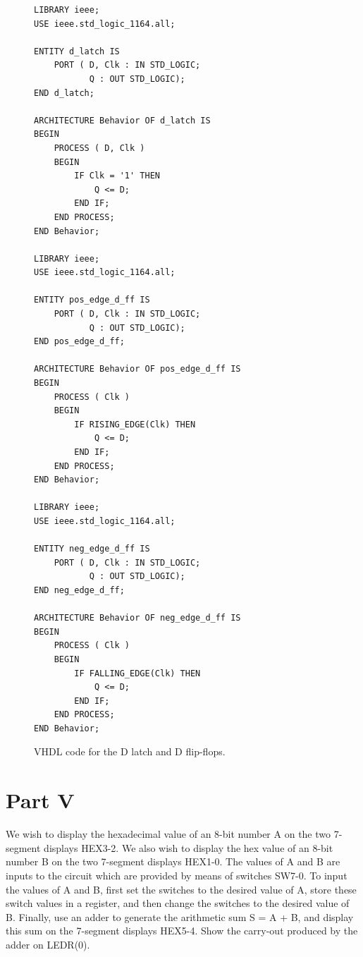 \documentclass{article}
\begin{document}
\begin{figure}[H]
    \centering
    \begin{verbatim}
LIBRARY ieee;
USE ieee.std_logic_1164.all;

ENTITY d_latch IS
    PORT ( D, Clk : IN STD_LOGIC;
           Q : OUT STD_LOGIC);
END d_latch;

ARCHITECTURE Behavior OF d_latch IS
BEGIN
    PROCESS ( D, Clk )
    BEGIN
        IF Clk = '1' THEN
            Q <= D;
        END IF;
    END PROCESS;
END Behavior;

LIBRARY ieee;
USE ieee.std_logic_1164.all;

ENTITY pos_edge_d_ff IS
    PORT ( D, Clk : IN STD_LOGIC;
           Q : OUT STD_LOGIC);
END pos_edge_d_ff;

ARCHITECTURE Behavior OF pos_edge_d_ff IS
BEGIN
    PROCESS ( Clk )
    BEGIN
        IF RISING_EDGE(Clk) THEN
            Q <= D;
        END IF;
    END PROCESS;
END Behavior;

LIBRARY ieee;
USE ieee.std_logic_1164.all;

ENTITY neg_edge_d_ff IS
    PORT ( D, Clk : IN STD_LOGIC;
           Q : OUT STD_LOGIC);
END neg_edge_d_ff;

ARCHITECTURE Behavior OF neg_edge_d_ff IS
BEGIN
    PROCESS ( Clk )
    BEGIN
        IF FALLING_EDGE(Clk) THEN
            Q <= D;
        END IF;
    END PROCESS;
END Behavior;
    \end{verbatim}
    \caption{VHDL code for the D latch and D flip-flops.}
    \label{fig:vhdl_storage}
\end{figure}

\section*{Part V}

We wish to display the hexadecimal value of an 8-bit number A on the two 7-segment displays HEX3-2. We also wish to display the hex value of an 8-bit number B on the two 7-segment displays HEX1-0. The values of A and B are inputs to the circuit which are provided by means of switches SW7-0. To input the values of A and B, first set the switches to the desired value of A, store these switch values in a register, and then change the switches to the desired value of B. Finally, use an adder to generate the arithmetic sum S = A + B, and display this sum on the 7-segment displays HEX5-4. Show the carry-out produced by the adder on LEDR(0).
\end{document}
